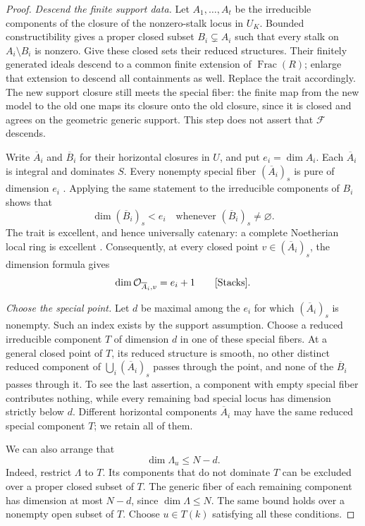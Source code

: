 \begin{proof}
\emph{Descend the finite support data.}
Let $A_1,\ldots,A_t$ be the irreducible components of the closure of
the nonzero-stalk locus in $U_K$.  Bounded constructibility gives a
proper closed subset $B_i\subsetneq A_i$ such that every stalk on
$A_i\setminus B_i$ is nonzero.  Give these closed sets their reduced
structures.  Their finitely generated ideals descend to a common finite
extension of $\operatorname{Frac}(R)$; enlarge that extension to descend
all containments as well.  Replace the trait accordingly.  The new
support closure still meets
the special fiber: the finite map from the new model to the old one
maps its closure onto the old closure, since it is closed and agrees
on the geometric generic support.  This step does not assert that
$\mathcal F$ descends.

Write $\overline A_i$ and $\overline B_i$ for their horizontal closures
in $U$, and put $e_i=\dim A_i$.  Each $\overline A_i$ is integral and
dominates $S$.  Every nonempty special fiber
$(\overline A_i)_s$ is pure of dimension $e_i$
\cite[Tag~0B2J]{Stacks}.  Applying the same statement to the
irreducible components of $B_i$ shows that
\[
 \dim(\overline B_i)_s<e_i
 \quad\text{whenever }(\overline B_i)_s\ne\varnothing.
\]
The trait is excellent, and hence universally catenary: a complete
Noetherian local ring is excellent \cite[Tag~07QW]{Stacks}.
Consequently, at every closed point $v\in(\overline A_i)_s$, the
dimension formula gives
\begin{equation}
\label{eq:support-local-dimension}
 \dim\mathcal O_{\overline A_i,v}=e_i+1
 \qquad\text{\cite[Tag~02JT]{Stacks}}.
\end{equation}

\emph{Choose the special point.}
Let $d$ be maximal among the $e_i$ for which
$(\overline A_i)_s$ is nonempty.  Such an index exists by the support
assumption.  Choose a reduced irreducible component $T$ of dimension
$d$ in one of these special fibers.  At a general closed point of $T$,
its reduced structure is smooth, no other distinct reduced component of
$\bigcup_i(\overline A_i)_s$ passes through the point, and none of the
$\overline B_i$ passes through it.  To see the last assertion, a
component with empty special fiber contributes nothing, while every
remaining bad special locus has dimension strictly below $d$.
Different horizontal components $\overline A_i$ may have the same
reduced special component $T$; we retain all of them.

We can also arrange that
\begin{equation}
\label{eq:support-cone-fiber}
 \dim\Lambda_u\leq N-d.
\end{equation}
Indeed, restrict $\Lambda$ to $T$.  Its components that do not dominate
$T$ can be excluded over a proper closed subset of $T$.  The generic
fiber of each remaining component has dimension at most $N-d$, since
$\dim\Lambda\leq N$.  The same bound holds over a nonempty open subset
of $T$.  Choose $u\in T(k)$ satisfying all these conditions.


\end{proof}
